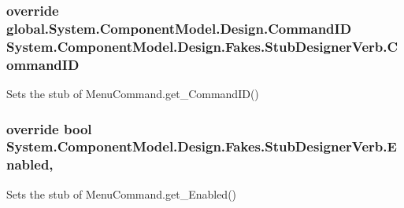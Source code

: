 \hypertarget{class_system_1_1_component_model_1_1_design_1_1_fakes_1_1_stub_designer_verb_a5d4d6a7f84892157267f400bce8ff55d}{
\subsubsection[{Command\-I\-D}]{\setlength{\rightskip}{0pt plus 5cm}override global.\-System.\-Component\-Model.\-Design.\-Command\-I\-D System.\-Component\-Model.\-Design.\-Fakes.\-Stub\-Designer\-Verb.\-Command\-I\-D\hspace{0.3cm}{\ttfamily [get]}}}\label{class_system_1_1_component_model_1_1_design_1_1_fakes_1_1_stub_designer_verb_a5d4d6a7f84892157267f400bce8ff55d}


Sets the stub of Menu\-Command.\-get\-\_\-\-Command\-I\-D()

\hypertarget{class_system_1_1_component_model_1_1_design_1_1_fakes_1_1_stub_designer_verb_a3dd3bae644b19c35b16fba384d0d342a}{
\subsubsection[{Enabled}]{\setlength{\rightskip}{0pt plus 5cm}override bool System.\-Component\-Model.\-Design.\-Fakes.\-Stub\-Designer\-Verb.\-Enabled\hspace{0.3cm}{\ttfamily [get]}, {\ttfamily [set]}}}\label{class_system_1_1_component_model_1_1_design_1_1_fakes_1_1_stub_designer_verb_a3dd3bae644b19c35b16fba384d0d342a}


Sets the stub of Menu\-Command.\-get\-\_\-\-Enabled()

